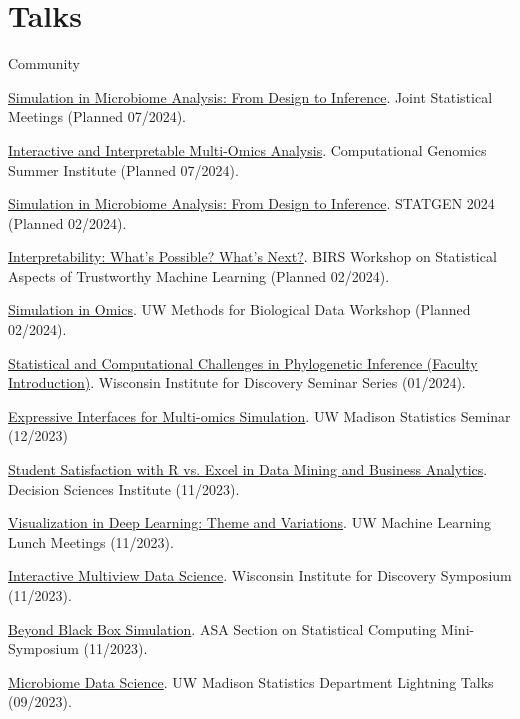 \documentclass[letterpaper]{article}
\renewenvironment{itemize}{
  \begin{list}{}{
    \setlength{\leftmargin}{1.5em}
  }
}{
  \end{list}
}
\begin{document}
\section*{Talks}

Community
\begin{itemize}
  \item \href{}{Simulation in Microbiome Analysis: From Design to Inference}. Joint Statistical Meetings (Planned 07/2024).
  \item \href{}{Interactive and Interpretable Multi-Omics Analysis}. Computational Genomics Summer Institute (Planned 07/2024).
  \item \href{}{Simulation in Microbiome Analysis: From Design to Inference}. STATGEN 2024 (Planned 02/2024).
  \item \href{https://krisrs1128.github.io/talks/2024/20240212/20240212.html}{Interpretability: What's Possible? What's Next?}. BIRS Workshop on Statistical Aspects of Trustworthy Machine Learning (Planned 02/2024).
  \item \href{https://github.com/krisrs1128/talks/blob/master/2024/20240207/20240207.Rmd}{Simulation in Omics}. UW Methods for Biological Data Workshop (Planned 02/2024).
  \item \href{https://krisrs1128.github.io/talks/2024/20240131/20240131.html#1}{Statistical and Computational Challenges in Phylogenetic Inference (Faculty Introduction)}. Wisconsin Institute for Discovery Seminar Series (01/2024). 
  \item \href{https://go.wisc.edu/4y9176}{Expressive Interfaces for Multi-omics Simulation}. UW Madison Statistics Seminar (12/2023)
  \item \href{https://github.com/krisrs1128/talks/blob/master/2023/20231118/dsi-kris.pptx}{Student Satisfaction with R vs. Excel in Data Mining and Business Analytics}. Decision Sciences Institute (11/2023).
  \item \href{https://go.wisc.edu/9p83o9}{Visualization in Deep Learning: Theme and Variations}. UW Machine Learning Lunch Meetings (11/2023).
  \item \href{https://go.wisc.edu/02jao8}{Interactive Multiview Data Science}. Wisconsin Institute for Discovery Symposium (11/2023).
  \item \href{https://go.wisc.edu/fg7wr4}{Beyond Black Box Simulation}. ASA Section on Statistical Computing Mini-Symposium (11/2023).
  \item \href{https://go.wisc.edu/uhka79}{Microbiome Data Science}. UW Madison Statistics Department Lightning Talks (09/2023).

\end{itemize}
\end{document}
